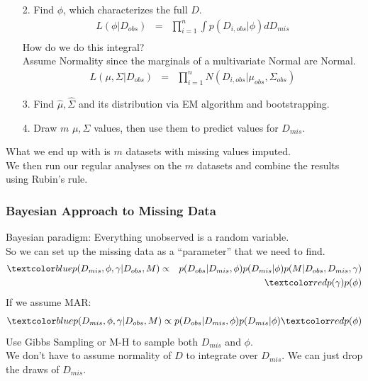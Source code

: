 \documentclass{beamer}
\begin{document}
\begin{frame}
\begin{enumerate}
\item[2.] Find $\phi$, which characterizes the full $D$.
\pause
\begin{eqnarray*}
L(\phi | D_{obs}) &=& \prod_{i=1}^n \int p(D_{i,obs} | \phi) dD_{mis} \\
\end{eqnarray*}
\pause
How do we do this integral? \\
\pause
\bigskip
Assume Normality since the marginals of a multivariate Normal are Normal.
\pause
\begin{eqnarray*}
L(\mu, \Sigma | D_{obs}) &=& \prod_{i=1}^n N(D_{i,obs} | \mu_{obs},
\Sigma_{obs}) 
\end{eqnarray*}
\pause
\item[3.] Find $\hat{\mu}, \hat{\Sigma}$ and its distribution via EM algorithm and bootstrapping.
\pause
\item[4.] Draw $m$ $\mu, \Sigma$ values, then use them to predict values for $D_{mis}$.
\end{enumerate}
\end{frame}

\begin{frame}
What we end up with is $m$ datasets with missing values imputed. \\
\pause
\bigskip
We then run our regular analyses on the $m$ datasets and combine the
results using Rubin's rule.
\end{frame}

\begin{frame}
\frametitle{Bayesian Approach to Missing Data}
\pause
Bayesian paradigm: Everything unobserved is a random variable.\\
\bigskip
\pause
So we can set up the missing data as a ``parameter'' that we need to find.
\pause
\begin{eqnarray*}
\blue{p(D_{mis}, \phi, \gamma | D_{obs}, M)} &\propto& p(D_{obs}| D_{mis}
, \phi) p(D_{mis}|\phi) p(M | D_{obs}, D_{mis}, \gamma) \\
&\phantom{\propto} &\red{p(\gamma) p(\phi)}
\end{eqnarray*}
\pause
If we assume MAR:
\pause
\begin{eqnarray*}
\blue{p(D_{mis}, \phi, \gamma | D_{obs}, M)} \propto p(D_{obs}| D_{mis}
, \phi) p(D_{mis}|\phi) \red{p(\phi)}\\
\end{eqnarray*}
\pause
Use Gibbs Sampling or M-H to sample both $D_{mis}$ and $\phi$.\\
\pause
\bigskip
We don't have to assume normality of $D$ to integrate over
$D_{mis}$. \pause We can just drop the draws of $D_{mis}$.
\end{frame}
\end{document}
